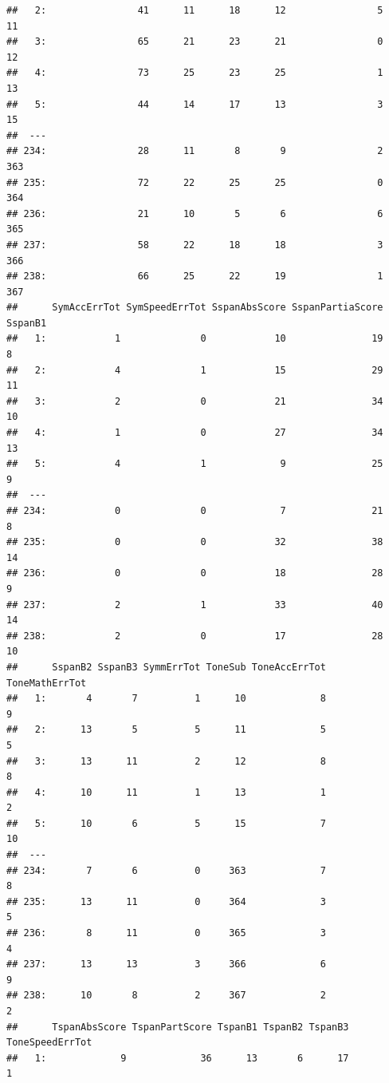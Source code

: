 \documentclass[]{book}
\theoremstyle{definition}
\theoremstyle{definition}
\theoremstyle{definition}
\theoremstyle{remark}
\begin{document}
\begin{verbatim}
##   2:                41      11      18      12                5     11
##   3:                65      21      23      21                0     12
##   4:                73      25      23      25                1     13
##   5:                44      14      17      13                3     15
##  ---                                                                  
## 234:                28      11       8       9                2    363
## 235:                72      22      25      25                0    364
## 236:                21      10       5       6                6    365
## 237:                58      22      18      18                3    366
## 238:                66      25      22      19                1    367
##      SymAccErrTot SymSpeedErrTot SspanAbsScore SspanPartiaScore SspanB1
##   1:            1              0            10               19       8
##   2:            4              1            15               29      11
##   3:            2              0            21               34      10
##   4:            1              0            27               34      13
##   5:            4              1             9               25       9
##  ---                                                                   
## 234:            0              0             7               21       8
## 235:            0              0            32               38      14
## 236:            0              0            18               28       9
## 237:            2              1            33               40      14
## 238:            2              0            17               28      10
##      SspanB2 SspanB3 SymmErrTot ToneSub ToneAccErrTot ToneMathErrTot
##   1:       4       7          1      10             8              9
##   2:      13       5          5      11             5              5
##   3:      13      11          2      12             8              8
##   4:      10      11          1      13             1              2
##   5:      10       6          5      15             7             10
##  ---                                                                
## 234:       7       6          0     363             7              8
## 235:      13      11          0     364             3              5
## 236:       8      11          0     365             3              4
## 237:      13      13          3     366             6              9
## 238:      10       8          2     367             2              2
##      TspanAbsScore TspanPartScore TspanB1 TspanB2 TspanB3 ToneSpeedErrTot
##   1:             9             36      13       6      17               1

\end{verbatim}
\end{document}
